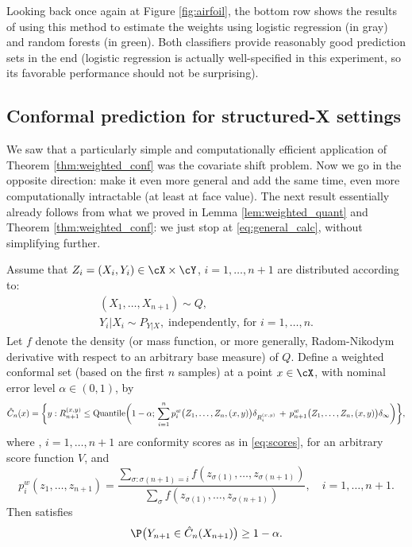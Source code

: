 \documentclass{article}
\begin{document}
Looking back once again at Figure \ref{fig:airfoil}, the bottom row shows the
results of using this method to estimate the weights using logistic regression
(in gray) and random forests (in green). Both classifiers provide reasonably
good prediction sets in the end (logistic regression is actually well-specified 
in this experiment, so its favorable performance should not be surprising). 

\subsection{Conformal prediction for structured-X settings}

We saw that a particularly simple and computationally efficient application of
Theorem \ref{thm:weighted_conf} was the covariate shift problem. Now we go in
the opposite direction: make it even more general and add the same time, even
more computationally intractable (at least at face value). The next result
essentially already follows from what we proved in Lemma
\ref{lem:weighted_quant} and Theorem \ref{thm:weighted_conf}: we just stop at
\eqref{eq:general_calc}, without simplifying further. 

\begin{theorem}
\label{thm:weighted_conf_gen}
Assume that $Z_i=(X_i,Y_i) \in \cX \times \cY$, $i=1,\dots,n+1$ are distributed
according to:
\begin{gather*}
(X_1,\dots,X_{n+1}) \sim Q, \\
Y_i|X_i \sim P_{Y|X}, \; \text{independently, for $i=1,\dots,n$}.
\end{gather*}
Let $f$ denote the density (or mass function, or more generally, Radom-Nikodym 
derivative with respect to an arbitrary base measure) of $Q$. Define a weighted
conformal set (based on the first $n$ samples) at a point $x \in \cX$, with
nominal error level $\alpha \in (0,1)$, by  
\begin{equation}
\label{eq:weighted_conf_gen}
\hat{C}_n(x) = \bigg\{ y : R_{n+1}^{(x,y)} \leq \mathrm{Quantile}\bigg( 1-\alpha; 
\, \sum_{i=1}^n p^w_i\big( Z_1,\dots,Z_n,(x,y) \big) \delta_{R_i^{(x,y)}} \,+\, 
p^w_{n+1}\big( Z_1,\dots,Z_n,(x,y) \big) \delta_\infty \bigg) \bigg\},  
\end{equation}
where , $i=1,\ldots,n+1$ are conformity scores as in
\eqref{eq:scores}, for an arbitrary score function $V$, and
\begin{equation}
\label{eq:weighted_prob_gen}
p^w_i(z_1,\dots,z_{n+1}) = 
\frac{\sum_{\sigma : \sigma(n+1)=i} f(z_{\sigma(1)},\dots, z_{\sigma(n+1)})}
{\sum_\sigma f(z_{\sigma(1)},\dots, z_{\sigma(n+1)})}, \quad i=1,\dots,n+1. 
\end{equation}
Then  satisfies 
\begin{equation}
\label{eq:weighted_cov_gen}
\P\big( Y_{n+1} \in \hC_n(X_{n+1}) \big) \geq 1-\alpha. 
\end{equation}
\end{theorem}
\end{document}
